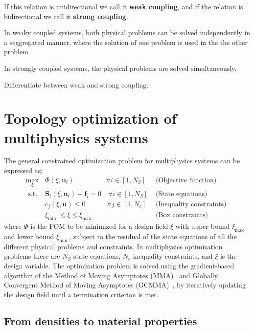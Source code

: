  If this relation is unidirectional
we call it \textbf{weak coupling}, and if the relation is bidirectional we call it 
\textbf{strong coupling}.

In weaky coupled systems, both physical problems can be solved independently in a seggregated 
manner, where the solution of one problem is used in the the other problem.

In strongly coupled systems, the physical problems are solved simultaneously.

Differentiate between weak and strong coupling.

\section{Topology optimization of multiphysics systems}

The general constrained optimization problem for multiphysics systems can be expressed as:
\begin{equation}
    \begin{array}{clr}
    \max\limits_{\xi} & \Phi(\xi, \mathbf{u}_i) \quad \quad \quad \quad \,\,\,\, \forall i \in\left[1, N_S\right]& \text { (Objective function) } \\
    \text { s.t. } & \mathbf{S}_i(\xi, \mathbf{u}_i)-\mathbf{f}_i=0 \quad \forall i \in\left[1, N_S\right] & \text { (State equations) } \\
    & c_j(\xi, \mathbf{u}) \leq 0 \quad \quad \quad \, \forall j \in\left[1, N_c\right] & \text { (Inequality constraints) } \\
    & \xi_{\text {min }} \leq \xi \leq \xi_{\text {max }} & \text { (Box constraints) }
    \end{array}
\end{equation}
where $\Phi$ is the FOM to be minimized for a design field $\xi$ with upper bound $\xi_{\text {max }}$ and lower bound $\xi_{\text {min }}$,
 subject to the residual of the state equations of all the different physical problems and constraints. In multiphysics optimization problems 
there are $N_S$ state equations, $N_c$ inequality constraints, and $\xi$ is the design variable. The optimization problem is solved using
 the gradient-based algorithm of the Method of Moving
Asymptotes (MMA)~\cite{MMA} and Globally Convergent Method of Moving Asymptotes (GCMMA)~\cite{GCMMA}, by iteratively updating the design field until a termination
criterion is met.

\subsection{From densities to material properties}


